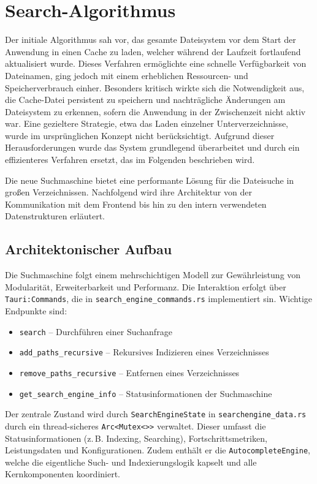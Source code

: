 \section{Search-Algorithmus}

Der initiale Algorithmus sah vor, das gesamte Dateisystem vor dem Start der Anwendung in einen Cache zu laden, welcher während der Laufzeit fortlaufend aktualisiert wurde.
 Dieses Verfahren ermöglichte eine schnelle Verfügbarkeit von Dateinamen, ging jedoch mit einem erheblichen Ressourcen- und Speicherverbrauch einher.
Besonders kritisch wirkte sich die Notwendigkeit aus, die Cache-Datei persistent zu speichern und nachträgliche Änderungen am Dateisystem zu erkennen, sofern die Anwendung in der Zwischenzeit nicht aktiv war.
Eine gezieltere Strategie, etwa das Laden einzelner Unterverzeichnisse, wurde im ursprünglichen Konzept nicht berücksichtigt.
Aufgrund dieser Herausforderungen wurde das System grundlegend überarbeitet und durch ein effizienteres Verfahren ersetzt, das im Folgenden beschrieben wird.

Die neue Suchmaschine bietet eine performante Lösung für die Dateisuche in großen Verzeichnissen.
Nachfolgend wird ihre Architektur von der Kommunikation mit dem Frontend bis hin zu den intern verwendeten Datenstrukturen erläutert.
\subsection{Architektonischer Aufbau}

Die Suchmaschine folgt einem mehrschichtigen Modell zur Gewährleistung von Modularität, Erweiterbarkeit und Performanz.
Die Interaktion erfolgt über \verb|Tauri:Commands|, die in \verb|search_engine_commands.rs| implementiert sin.
Wichtige Endpunkte sind:

\begin{itemize}
  \item \texttt{search} – Durchführen einer Suchanfrage
  \item \texttt{add\_paths\_recursive} – Rekursives Indizieren eines Verzeichnisses
  \item \texttt{remove\_paths\_recursive} – Entfernen eines Verzeichnisses
  \item \texttt{get\_search\_engine\_info} – Statusinformationen der Suchmaschine
\end{itemize}

Der zentrale Zustand wird durch \verb|SearchEngineState| in \verb|searchengine_data.rs| durch ein thread-sicheres \verb|Arc<Mutex<>>| verwaltet.
Dieser umfasst die Statusinformationen (z.\,B. Indexing, Searching), Fortschrittsmetriken, Leistungsdaten und Konfigurationen.
Zudem enthält er die \verb|AutocompleteEngine|, welche die eigentliche Such- und Indexierungslogik kapselt und alle Kernkomponenten koordiniert.

